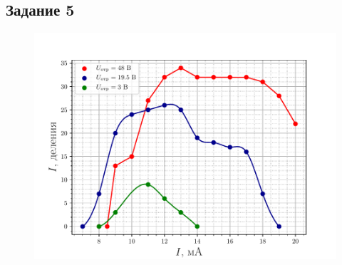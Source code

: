 
\subsection{Задание 5}
\begin{figure}[H]
		\centering
		\includegraphics[height=0.4\textheight]{fig/task5}
		\caption{}
		\label{fig:task5}
\end{figure}

